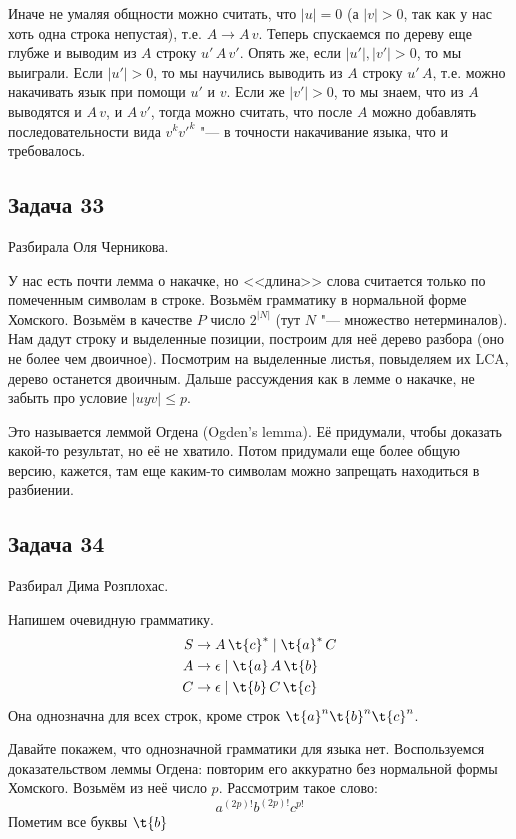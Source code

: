 		Иначе не умаляя общности можно считать, что $|u|=0$ (а $|v|>0$, так как у нас хоть одна
		строка непустая), т.е. $A \to A\, v$.
		Теперь спускаемся по дереву еще глубже и выводим из $A$ строку $u'\,A\,v'$.
		Опять же, если $|u'|, |v'|>0$, то мы выиграли.
		Если $|u'|>0$, то мы научились выводить из $A$ строку $u'\,A$,
		т.е. можно накачивать язык при помощи $u'$ и $v$.
		Если же $|v'|>0$, то мы знаем, что из $A$ выводятся и $A\,v$, и $A\,v'$,
		тогда можно считать, что после $A$ можно добавлять последовательности вида
		$v^k{v'}^k$ "--- в точности накачивание языка, что и требовалось.

\subsection{Задача 33}
	\TODO
	Разбирала Оля Черникова.

	У нас есть почти лемма о накачке, но <<длина>> слова считается только по помеченным символам в строке.
	Возьмём грамматику в нормальной форме Хомского.
	Возьмём в качестве $P$ число $2^{|N|}$ (тут $N$ "--- множество нетерминалов).
	Нам дадут строку и выделенные позиции, построим для неё дерево разбора (оно не более чем двоичное).
	Посмотрим на выделенные листья, повыделяем их LCA, дерево останется двоичным.
	\TODO Дальше рассуждения как в лемме о накачке, не забыть про условие $|uyv|\le p$.

	\begin{Rem}
		Это называется леммой Огдена (Ogden's lemma).
		Её придумали, чтобы доказать какой-то результат, но её не хватило.
		Потом придумали еще более общую версию, кажется, там еще каким-то символам можно запрещать находиться в разбиении.
	\end{Rem}

\subsection{Задача 34}
	\TODO
	Разбирал Дима Розплохас.

	Напишем очевидную грамматику.
	\begin{align*}
		S &\to A\,\t{c}^{*} \mid \t{a}^{*}\,C \\
		A &\to \epsilon \mid \t{a}\,A\,\t{b} \\
		C &\to \epsilon \mid \t{b}\,C\,\t{c} \\
	\end{align*}
	Она однозначна для всех строк, кроме строк $\t{a}^n\t{b}^n\t{c}^n$.

	Давайте покажем, что однозначной грамматики для языка нет.
	Воспользуемся доказательством леммы Огдена: повторим его аккуратно без нормальной формы Хомского.
	Возьмём из неё число $p$.
	Рассмотрим такое слово:
	\[ a^{(2p)!}b^{(2p)!}c^{p!} \]
	Пометим все буквы $\t{b}$
	\TODO

